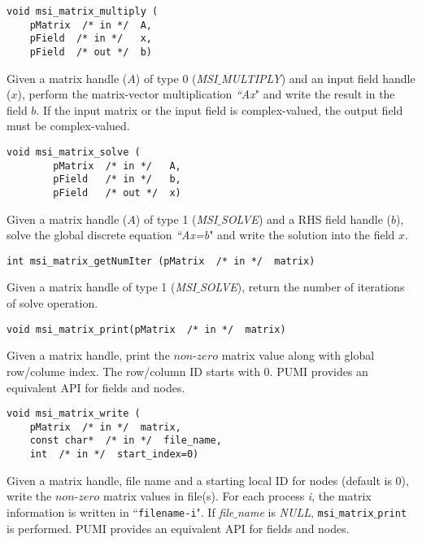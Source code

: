 \begin{verbatim}
void msi_matrix_multiply (
    pMatrix  /* in */  A, 
    pField  /* in */   x, 
    pField  /* out */  b)
\end{verbatim}\vspace{-.5cm}\hspace{1cm}
Given a matrix handle ($A$) of type 0 (\textit{MSI$\_$MULTIPLY}) and an input field handle ($x$), perform the matrix-vector multiplication \textit{``Ax}" and write the result in the field $b$. If the input matrix or the input field is complex-valued, the output field must be complex-valued.

\begin{verbatim}
void msi_matrix_solve (
        pMatrix  /* in */   A, 
        pField   /* in */   b, 
        pField   /* out */  x)
\end{verbatim}\vspace{-.5cm}\hspace{1cm}
Given a matrix handle ($A$) of type 1 (\textit{MSI$\_$SOLVE}) and a RHS field handle ($b$), solve the global discrete equation \textit{``Ax=b}" and write the solution into the field $x$. 

\begin{verbatim}
int msi_matrix_getNumIter (pMatrix  /* in */  matrix)
\end{verbatim}\vspace{-.5cm}\hspace{1cm}
Given a matrix handle of type 1 (\textit{MSI$\_$SOLVE}), return the number of iterations of solve operation.

\begin{verbatim}
void msi_matrix_print(pMatrix  /* in */  matrix)
\end{verbatim}\vspace{-.5cm}\hspace{1cm}
Given a matrix handle, print the $non$-$zero$ matrix value along with global row/colume index. The row/column ID starts with 0. PUMI provides an equivalent API for fields and nodes.

\begin{verbatim}
void msi_matrix_write (
    pMatrix  /* in */  matrix, 
    const char*  /* in */  file_name, 
    int  /* in */  start_index=0)
\end{verbatim}\vspace{-.5cm}\hspace{1cm}
Given a matrix handle, file name and a starting local ID for nodes (default is 0), write the $non$-$zero$ matrix values in file(s). For each process \textit{i}, the matrix information is written in ``\texttt{filename-i}". If \textit{file$\_$name} is \textit{NULL}, \texttt{msi$\_$matrix$\_$print} is performed.
PUMI provides an equivalent API for fields and nodes. 
